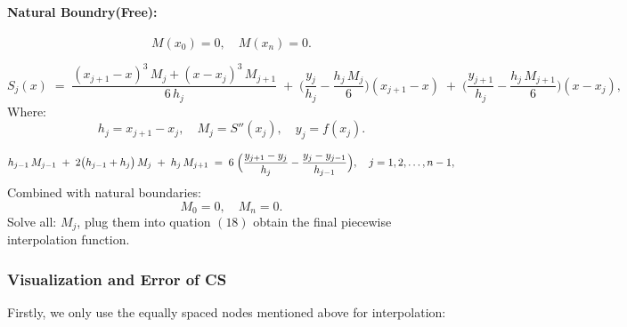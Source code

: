 \documentclass[11pt]{article}
\newcommand{\hj}{h_j}
\newcommand{\hjm}{h_{j-1}}
\begin{document}
\paragraph{Natural Boundry(Free):}
\[
  M(x_0)=0,\quad M(x_n)=0.
\]


\begin{equation}\label{eq:cubic-spline-piece}
S_j(x)\;=\;
\frac{(x_{j+1}-x)^3\,M_j + (x - x_j)^3\,M_{j+1}}{6\,h_j}
\;+\;
\biggl(\frac{y_j}{h_j}-\frac{h_j\,M_j}{6}\biggr)(x_{j+1}-x)
\;+\;
\biggl(\frac{y_{j+1}}{h_j}-\frac{h_j\,M_{j+1}}{6}\biggr)(x - x_j),
\end{equation}
Where:
\[
h_j = x_{j+1}-x_j,\quad
M_j = S''(x_j),\quad
y_j = f(x_j).
\]

\begin{equation}\label{eq:cubic-spline-tridiag}
\hjm\,M_{j-1}
\;+\;2\bigl(\hjm+\hj\bigr)\,M_j
\;+\;\hj\,M_{j+1}
\;=\;
6\;\Bigl(\frac{y_{j+1}-y_j}{\hj}-\frac{y_j-y_{j-1}}{\hjm}\Bigr),
\quad j=1,2,\dots,n-1,
\end{equation}
Combined with natural boundaries: 
\[
M_0=0,\quad M_n=0.
\]
Solve all: \(M_j\), plug them into quation $(18)$ obtain the final piecewise interpolation function.

\subsubsection{Visualization and Error of CS}

Firstly, we only use the equally spaced nodes mentioned above for interpolation:
\FloatBarrier
\end{document}
